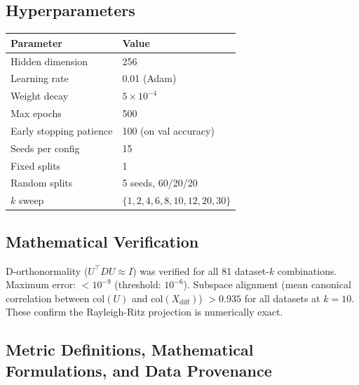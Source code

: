 \documentclass[11pt]{article}
\begin{document}
\subsection{Hyperparameters}

\begin{center}
\begin{tabular}{ll}
\toprule
Parameter & Value \\
\midrule
Hidden dimension & 256 \\
Learning rate & 0.01 (Adam) \\
Weight decay & $5\times10^{-4}$ \\
Max epochs & 500 \\
Early stopping patience & 100 (on val accuracy) \\
Seeds per config & 15 \\
Fixed splits & 1 \\
Random splits & 5 seeds, 60/20/20 \\
$k$ sweep & $\{1,2,4,6,8,10,12,20,30\}$ \\
\bottomrule
\end{tabular}
\end{center}

\subsection{Mathematical Verification}

D-orthonormality ($U^\top D U \approx I$) was verified for all 81 dataset-$k$
combinations.  Maximum error: $< 10^{-9}$ (threshold: $10^{-6}$).  Subspace alignment
(mean canonical correlation between $\text{col}(U)$ and $\text{col}(X_{\text{diff}})$)
$> 0.935$ for all datasets at $k{=}10$.  These confirm the Rayleigh-Ritz projection is
numerically exact.

\subsection{Metric Definitions, Mathematical Formulations, and Data Provenance}
\label{sec:metrics_provenance}
\end{document}
